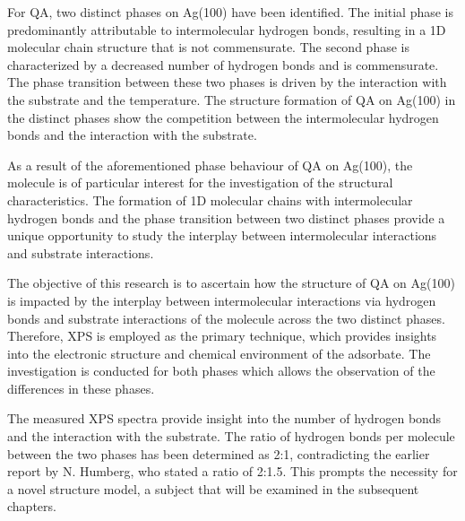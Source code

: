 For \ac{QA}, two distinct phases on Ag(100) have been identified. The initial phase is predominantly attributable to intermolecular hydrogen bonds, resulting in a 1D molecular chain structure that is not commensurate. The second phase is characterized by a decreased number of hydrogen bonds and is commensurate. The phase transition between these two phases is driven by the interaction with the substrate and the temperature.\autocite{Humberg2024, Humberg2020} The structure formation of \ac{QA} on Ag(100) in the distinct phases show the competition between the intermolecular hydrogen bonds and the interaction with the substrate.

As a result of the aforementioned phase behaviour of \ac{QA} on Ag(100), the molecule is of particular interest for the investigation of the structural characteristics. The formation of 1D molecular chains with intermolecular hydrogen bonds and the phase transition between two distinct phases provide a unique opportunity to study the interplay between intermolecular interactions and substrate interactions.

The objective of this research is to ascertain how the structure of \ac{QA} on Ag(100) is impacted by the interplay between intermolecular interactions via hydrogen bonds and substrate interactions of the molecule across the two distinct phases. Therefore, \ac{XPS} is employed as the primary technique, which provides insights into the electronic structure and chemical environment of the adsorbate. The investigation is conducted for both phases which allows the observation of the differences in these phases.

The measured \ac{XPS} spectra provide insight into the number of hydrogen bonds and the interaction with the substrate. The ratio of hydrogen bonds per molecule between the two phases has been determined as 2:1, contradicting the earlier report by N. Humberg, who stated a ratio of 2:1.5.\autocite{Humberg2024, Humberg2020} This prompts the necessity for a novel structure model, a subject that will be examined in the subsequent chapters.

\cleardoublepage